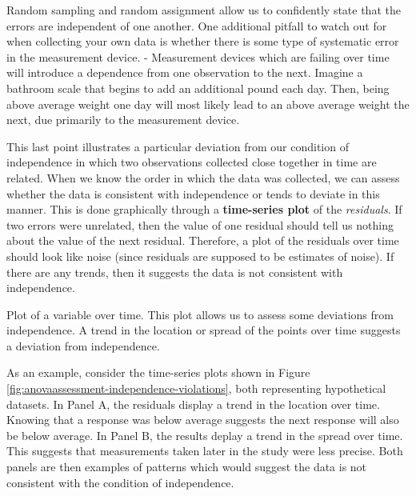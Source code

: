 \documentclass[]{book}
\theoremstyle{definition}
\theoremstyle{definition}
\theoremstyle{remark}
\let\BeginKnitrBlock\begin \let\EndKnitrBlock\end
\begin{document}
Random sampling and random assignment allow us to confidently state that
the errors are independent of one another. One additional pitfall to
watch out for when collecting your own data is whether there is some
type of systematic error in the measurement device. - Measurement
devices which are failing over time will introduce a dependence from one
observation to the next. Imagine a bathroom scale that begins to add an
additional pound each day. Then, being above average weight one day will
most likely lead to an above average weight the next, due primarily to
the measurement device.

This last point illustrates a particular deviation from our condition of
independence in which two observations collected close together in time
are related. When we know the order in which the data was collected, we
can assess whether the data is consistent with independence or tends to
deviate in this manner. This is done graphically through a
\textbf{time-series plot} of the \emph{residuals}. If two errors were
unrelated, then the value of one residual should tell us nothing about
the value of the next residual. Therefore, a plot of the residuals over
time should look like noise (since residuals are supposed to be
estimates of noise). If there are any trends, then it suggests the data
is not consistent with independence.

\BeginKnitrBlock{definition}[Time Series Plot]
\protect\hypertarget{def:defn-time-series-plot}{}{\label{def:defn-time-series-plot}
{} }Plot of a variable over time. This
plot allows us to assess some deviations from independence. A trend in
the location or spread of the points over time suggests a deviation from
independence.
\EndKnitrBlock{definition}

As an example, consider the time-series plots shown in Figure
\ref{fig:anovaassessment-independence-violations}, both representing
hypothetical datasets. In Panel A, the residuals display a trend in the
location over time. Knowing that a response was below average suggests
the next response will also be below average. In Panel B, the results
deplay a trend in the spread over time. This suggests that measurements
taken later in the study were less precise. Both panels are then
examples of patterns which would suggest the data is not consistent with
the condition of independence.
\end{document}
